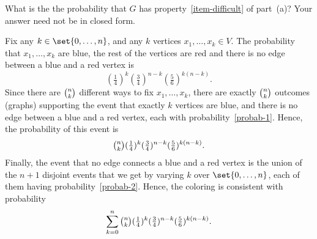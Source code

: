 \documentclass[quiz]{mcs}
\begin{document}
\begin{problem}
\begin{enumerate}
\end{enumerate}


\ppart What is the the probability that $G$ has
property~\eqref{item-difficult} of part~(a)?  Your answer need not be
in closed form.

\begin{solution}
Fix any $k\in\set{0,\dots,n}$, and any $k$ vertices $x_1,\dots,x_k\in
V$. The probability that $x_1,\dots,x_k$ are blue, the rest of the
vertices are red and there is no edge between a blue and a red vertex
is 
\begin{equation} \label{probab-1}
(\tfrac{1}{4})^k 
(\tfrac{3}{4})^{n-k}
(\tfrac{5}{6})^{k(n-k)}.
\end{equation}
Since there are $\tbinom{n}{k}$ different ways to fix $x_1,\dots,x_k$,
there are exactly $\tbinom{n}{k}$ outcomes (graphs) supporting the
event that exactly $k$ vertices are blue, and there is no edge between
a blue and a red vertex, each with
probability~\eqref{probab-1}. Hence, the probability of this event is 
\begin{equation} \label{probab-2}
\tbinom{n}{k}
(\tfrac{1}{4})^k 
(\tfrac{3}{4})^{n-k}
(\tfrac{5}{6})^{k(n-k)}.
\end{equation}
Finally, the event that no edge connects a blue and a red vertex is
the union of the $n+1$ disjoint events that we get by varying $k$ over 
$\set{0,\dots,n}$, each of them having probability~\eqref{probab-2}. 
Hence, the coloring is consistent with probability 
\[
\sum_{k=0}^{n}
\tbinom{n}{k}
(\tfrac{1}{4})^k 
(\tfrac{3}{4})^{n-k}
(\tfrac{5}{6})^{k(n-k)}.
\]
\end{solution}


\eparts
\end{problem}


\end{document}
